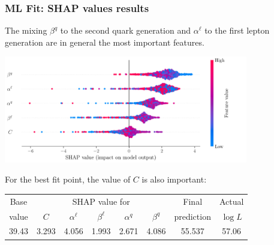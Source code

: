 \documentclass[mathserif, 10pt]{beamer}
\begin{document}
\begin{frame}\frametitle{ML Fit: SHAP values results}

    The mixing \(\beta^q\) to the second quark generation and $\alpha^\ell$ to the first lepton generation are in general the most important features.
    \begin{center}
        \includegraphics[width=0.8\textwidth]{figures/SHAP_summary.pdf}
    \end{center}

    For the best fit point, the value of $C$ is also important:
    \begin{center}
        \begin{tabular}{|*{8}{c|}}\hline
            Base  & \multicolumn{5}{c|}{SHAP value for} & Final         & Actual                                                        \\ \cline{2-6}
            value & $C$                                 & $\alpha^\ell$ & $\beta^\ell$ & $\alpha^q$ & $\beta^q$ & prediction & $\log L$ \\\hline
            39.43 & 3.293                               & 4.056         & 1.993        & 2.671      & 4.086     & 55.537     & 57.06    \\\hline
        \end{tabular}
    \end{center}

\end{frame}
\end{document}
